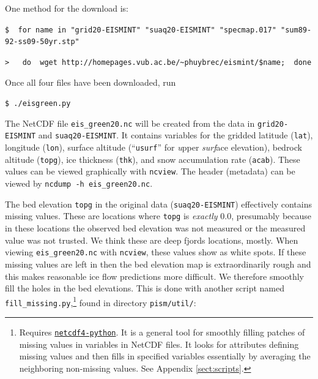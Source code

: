 \documentclass[11pt,final]{amsart}
\begin{document}
\noindent One method for the download is: \scriptsize

\verb|$  for name in "grid20-EISMINT" "suaq20-EISMINT" "specmap.017" "sum89-92-ss09-50yr.stp"|

\verb|>   do  wget http://homepages.vub.ac.be/~phuybrec/eismint/$name;  done|

\normalsize\noindent Once all four files have been downloaded, run

\verb|$ ./eisgreen.py|

\noindent The NetCDF file \verb|eis_green20.nc| will be created from the data in \verb|grid20-EISMINT| and \verb|suaq20-EISMINT|.  It contains variables for the gridded latitude (\verb|lat|), longitude (\verb|lon|), surface altitude (``\verb|usurf|'' for \emph{u}pper \emph{surf}ace elevation), bedrock altitude (\verb|topg|), ice thickness (\verb|thk|), and snow accumulation rate (\verb|acab|).  These values can be viewed graphically with \verb|ncview|.  The header (metadata) can be viewed by \verb|ncdump -h eis_green20.nc|.

The bed elevation \verb|topg| in the original data (\verb|suaq20-EISMINT|) effectively contains missing values.  These are locations where \verb|topg| is \emph{exactly} $0.0$, presumably because in these locations the observed bed elevation was not measured or the measured value was not trusted.  We think these are deep fjords locations, mostly.  When viewing \verb|eis_green20.nc| with \verb|ncview|, these values show as white spots.  If these missing values are left in then the bed elevation map is extraordinarily rough and this makes reasonable ice flow predictions more difficult.  We therefore smoothly fill the holes in the bed elevations.  This is done with another script named \verb|fill_missing.py|,\footnote{Requires \href{http://code.google.com/p/netcdf4-python/}{\texttt{netcdf4-python}}.  It is a general tool for smoothly filling patches of missing values in variables in NetCDF files.  It looks for attributes defining missing values and then fills in specified variables essentially by averaging the neighboring non-missing values.  See Appendix \ref{sect:scripts}.} found in directory \verb|pism/util/|:
\end{document}
